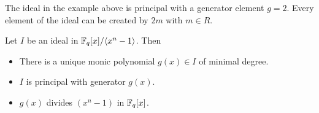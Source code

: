 The ideal in the example above is principal with a generator element $g = 2$. Every element of the ideal can be created by $2m$ with $m \in R$.

\begin{theorem}
  Let $I$ be an ideal in $\mathbb{F}_q[x] / \langle x^n-1 \rangle$. Then
  \begin{itemize}
    \item There is a unique monic polynomial $g(x) \in I$ of minimal degree.
    \item $I$ is principal with generator $g(x)$.
    \item $g(x)$ divides $(x^n-1)$ in $\mathbb{F}_q[x]$.
  \end{itemize}

\end{theorem}
